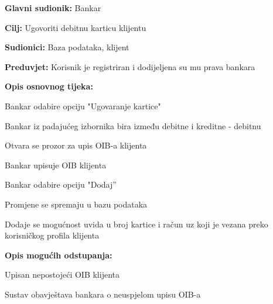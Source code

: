                 
                \noindent {}
                \begin{packed_item}
                
                  \item \textbf{Glavni sudionik: }Bankar
                  \item  \textbf{Cilj:} Ugovoriti debitnu karticu klijentu
                  \item  \textbf{Sudionici:} Baza podataka, klijent
                  \item  \textbf{Preduvjet:} Korisnik je registriran i dodijeljena su mu prava bankara
                  \item  \textbf{Opis osnovnog tijeka:}
                  
                  \item[] \begin{packed_enum}
                
                    \item Bankar odabire opciju "Ugovaranje kartice"
                    \item Bankar iz padajućeg izbornika bira između debitne i kreditne - debitnu
                    \item Otvara se prozor za upis OIB-a klijenta
                    \item Bankar upisuje OIB klijenta
                    \item Bankar odabire  opciju "Dodaj”
                    \item Promjene se spremaju u bazu podataka
                    \item Dodaje se mogućnost uvida u broj kartice i račun uz koji je vezana preko korisničkog profila klijenta            
                  \end{packed_enum}
                  
                  \item  \textbf{Opis mogućih odstupanja:}
                  
                  \item[] \begin{packed_item}
                
                        \item[2.a] Upisan nepostojeći OIB klijenta
                    \item[] \begin{packed_enum}
                      
                      \item Sustav obavještava bankara o neuspjelom upisu OIB-a
                      
                    \end{packed_enum}
                    
                  \end{packed_item}
                \end{packed_item}
                
